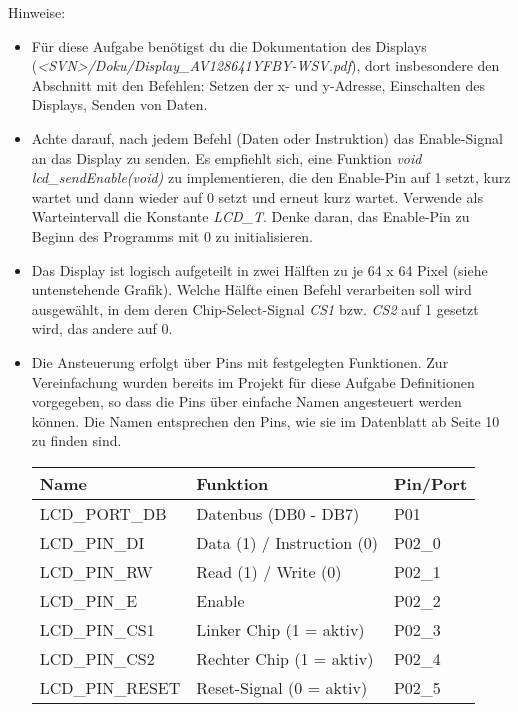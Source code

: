 Hinweise:
\begin{itemize}
\item
Für diese Aufgabe benötigst du die Dokumentation des Displays (\textit{<SVN>/Doku/Display\_AV128641YFBY-WSV.pdf}), dort insbesondere den Abschnitt mit den Befehlen: Setzen der x- und y-Adresse, Einschalten des Displays, Senden von Daten.

\item
Achte darauf, nach jedem Befehl (Daten oder Instruktion) das Enable-Signal an das Display zu senden.
Es empfiehlt sich, eine Funktion \textit{void lcd\_sendEnable(void)} zu implementieren, die den Enable-Pin auf 1 setzt, kurz wartet und dann wieder auf 0 setzt und erneut kurz wartet.
Verwende als Warteintervall die Konstante \emph{LCD\_T}.
Denke daran, das Enable-Pin zu Beginn des Programms mit 0 zu initialisieren.

\item
Das Display ist logisch aufgeteilt in zwei Hälften zu je 64 x 64 Pixel (siehe untenstehende Grafik).
Welche Hälfte einen Befehl verarbeiten soll wird ausgewählt, in dem deren Chip-Select-Signal \emph{CS1} bzw. \emph{CS2} auf 1 gesetzt wird, das andere auf 0.

\item
Die Ansteuerung erfolgt über Pins mit festgelegten Funktionen. Zur Vereinfachung wurden bereits im Projekt für diese Aufgabe Definitionen vorgegeben, so dass die Pins über einfache Namen angesteuert werden können. Die Namen entsprechen den Pins, wie sie im Datenblatt ab Seite 10 zu finden sind.

\begin{center}
\begin{tabular}{l|l|l}
	\toprule
\textbf{Name} & \textbf{Funktion} & \textbf{Pin/Port} \\ 
 \midrule
LCD\_PORT\_DB & Datenbus (DB0 - DB7) & P01 \\ 
LCD\_PIN\_DI & Data (1) / Instruction (0) & P02\_0 \\ 
LCD\_PIN\_RW & Read (1) / Write (0) & P02\_1 \\ 
LCD\_PIN\_E & Enable & P02\_2 \\ 
LCD\_PIN\_CS1 & Linker Chip (1 = aktiv) & P02\_3 \\ 
LCD\_PIN\_CS2 & Rechter Chip (1 = aktiv) & P02\_4 \\ 
LCD\_PIN\_RESET & Reset-Signal (0 = aktiv) & P02\_5 \\ 
\bottomrule
\end{tabular}
\end{center}


\end{itemize}
